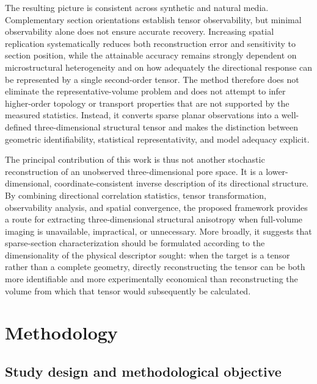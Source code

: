 \documentclass{article}
\begin{document}
The resulting picture is consistent across synthetic and natural media. Complementary section orientations establish tensor observability, but minimal observability alone does not ensure accurate recovery. Increasing spatial replication systematically reduces both reconstruction error and sensitivity to section position, while the attainable accuracy remains strongly dependent on microstructural heterogeneity and on how adequately the directional response can be represented by a single second-order tensor. The method therefore does not eliminate the representative-volume problem and does not attempt to infer higher-order topology or transport properties that are not supported by the measured statistics. Instead, it converts sparse planar observations into a well-defined three-dimensional structural tensor and makes the distinction between geometric identifiability, statistical representativity, and model adequacy explicit.

The principal contribution of this work is thus not another stochastic reconstruction of an unobserved three-dimensional pore space. It is a lower-dimensional, coordinate-consistent inverse description of its directional structure. By combining directional correlation statistics, tensor transformation, observability analysis, and spatial convergence, the proposed framework provides a route for extracting three-dimensional structural anisotropy when full-volume imaging is unavailable, impractical, or unnecessary. More broadly, it suggests that sparse-section characterization should be formulated according to the dimensionality of the physical descriptor sought: when the target is a tensor rather than a complete geometry, directly reconstructing the tensor can be both more identifiable and more experimentally economical than reconstructing the volume from which that tensor would subsequently be calculated.


\section{Methodology}
\label{sec:methodology}

\subsection{Study design and methodological objective}
\label{subsec:study_design}
\end{document}
